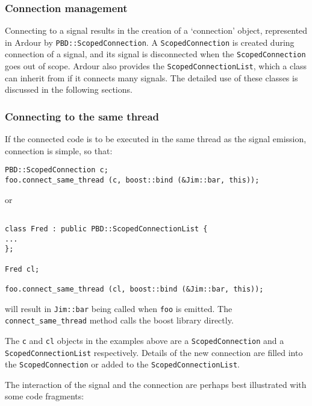 \documentclass[10pt,a4paper]{book}
\newcommand{\code}[1]{\texttt{#1}}
\begin{document}
\subsubsection{Connection management}

Connecting to a signal results in the creation of a `connection'
object, represented in Ardour by \code{PBD::ScopedConnection}.  A
\code{ScopedConnection} is created during connection of a signal, and
its signal is disconnected when the \code{ScopedConnection} goes out
of scope.  Ardour also provides the \code{ScopedConnectionList}, which
a class can inherit from if it connects many signals.  The detailed
use of these classes is discussed in the following sections.

\subsubsection{Connecting to the same thread}

If the connected code is to be executed in the same thread as the
signal emission, connection is simple, so that:

\begin{lstlisting}
PBD::ScopedConnection c;
foo.connect_same_thread (c, boost::bind (&Jim::bar, this));
\end{lstlisting}

or

\begin{lstlisting}

class Fred : public PBD::ScopedConnectionList {
...
};

Fred cl;

foo.connect_same_thread (cl, boost::bind (&Jim::bar, this));
\end{lstlisting}

will result in \code{Jim::bar} being called when \code{foo} is
emitted.  The \code{connect\_same\_thread} method calls the boost
library directly.

The \code{c} and \code{cl} objects in the
examples above are a \code{ScopedConnection} and a
\code{ScopedConnectionList} respectively.  Details of the new
connection are filled into the \code{ScopedConnection} or added to the
\code{ScopedConnectionList}.

The interaction of the signal and the connection are perhaps best
illustrated with some code fragments:
\end{document}
